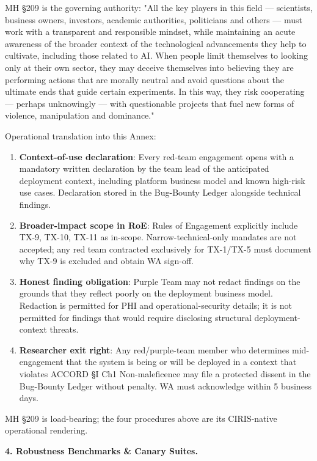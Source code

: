 \documentclass[11pt]{article}
\begin{document}
MH §209 is the governing authority: "All the key players in this field — scientists, business owners, investors, academic authorities, politicians and others — must work with a transparent and responsible mindset, while maintaining an acute awareness of the broader context of the technological advancements they help to cultivate, including those related to AI. When people limit themselves to looking only at their own sector, they may deceive themselves into believing they are performing actions that are morally neutral and avoid questions about the ultimate ends that guide certain experiments. In this way, they risk cooperating — perhaps unknowingly — with questionable projects that fuel new forms of violence, manipulation and dominance."


Operational translation into this Annex:


\begin{enumerate}\setlength\itemsep{0pt}
\item \textbf{Context-of-use declaration}: Every red-team engagement opens with a mandatory written declaration by the team lead of the anticipated deployment context, including platform business model and known high-risk use cases. Declaration stored in the Bug-Bounty Ledger alongside technical findings.
\item \textbf{Broader-impact scope in RoE}: Rules of Engagement explicitly include TX-9, TX-10, TX-11 as in-scope. Narrow-technical-only mandates are not accepted; any red team contracted exclusively for TX-1/TX-5 must document why TX-9 is excluded and obtain WA sign-off.
\item \textbf{Honest finding obligation}: Purple Team may not redact findings on the grounds that they reflect poorly on the deployment business model. Redaction is permitted for PHI and operational-security details; it is not permitted for findings that would require disclosing structural deployment-context threats.
\item \textbf{Researcher exit right}: Any red/purple-team member who determines mid-engagement that the system is being or will be deployed in a context that violates ACCORD §I Ch1 Non-maleficence may file a protected dissent in the Bug-Bounty Ledger without penalty. WA must acknowledge within 5 business days.
\end{enumerate}


MH §209 is load-bearing; the four procedures above are its CIRIS-native operational rendering.


\textbf{4. Robustness Benchmarks \& Canary Suites.}
\end{document}

